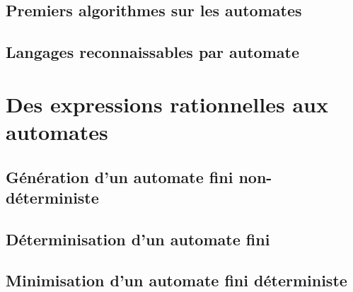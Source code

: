 \subsection{Premiers algorithmes sur les automates}




 
\subsection{Langages reconnaissables par automate}







 
\section{Des expressions rationnelles aux automates}
 
\subsection{Génération d'un automate fini non-déterministe}






 
\subsection{Déterminisation d'un automate fini}





 
\subsection{Minimisation d'un automate fini déterministe}






 
